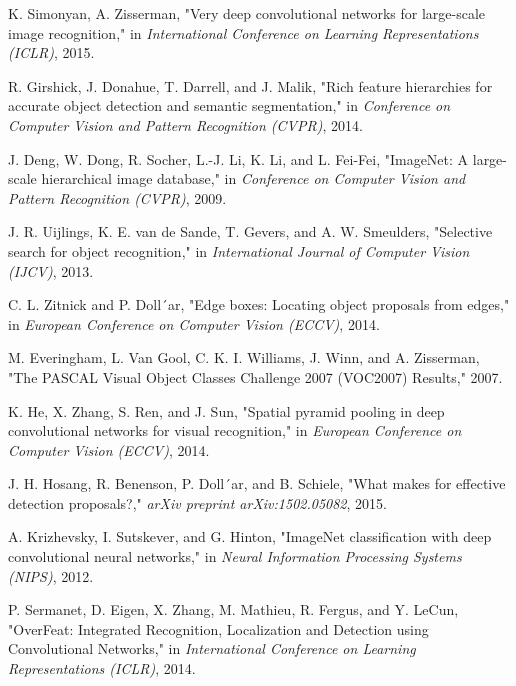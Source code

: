 \documentclass[conference]{IEEEtran}
\begin{document}
\begin{thebibliography}{00}

 K. Simonyan, A. Zisserman, "Very deep convolutional networks for large-scale image recognition," in \textit{International Conference on Learning Representations (ICLR)}, 2015.

 R. Girshick, J. Donahue, T. Darrell, and J. Malik, "Rich feature hierarchies for accurate object detection and semantic segmentation," in \textit{Conference on Computer Vision and Pattern Recognition (CVPR)}, 2014.

 J. Deng, W. Dong, R. Socher, L.-J. Li, K. Li, and L. Fei-Fei, "ImageNet: A large-scale hierarchical image database," in \textit{Conference on Computer Vision and Pattern Recognition (CVPR)}, 2009.

 J. R. Uijlings, K. E. van de Sande, T. Gevers, and A. W. Smeulders, "Selective search for object recognition," in \textit{International Journal of Computer Vision (IJCV)}, 2013.

 C. L. Zitnick and P. Doll´ar, "Edge boxes: Locating object proposals from edges," in \textit{European Conference on Computer Vision (ECCV)}, 2014.

 M. Everingham, L. Van Gool, C. K. I. Williams, J. Winn, and A. Zisserman, "The PASCAL Visual Object Classes Challenge 2007 (VOC2007) Results," 2007.

 K. He, X. Zhang, S. Ren, and J. Sun, "Spatial pyramid pooling in deep convolutional networks for visual recognition," in \textit{European Conference on Computer Vision (ECCV)}, 2014.

 J. H. Hosang, R. Benenson, P. Doll´ar, and B. Schiele, "What makes for effective detection proposals?," \textit{arXiv preprint arXiv:1502.05082}, 2015.

 A. Krizhevsky, I. Sutskever, and G. Hinton, "ImageNet classification with deep convolutional neural networks," in \textit{Neural Information Processing Systems (NIPS)}, 2012.

 P. Sermanet, D. Eigen, X. Zhang, M. Mathieu, R. Fergus, and Y. LeCun, "OverFeat: Integrated Recognition, Localization and Detection using Convolutional Networks," in \textit{International Conference on Learning Representations (ICLR)}, 2014.


\end{thebibliography}
\end{document}
